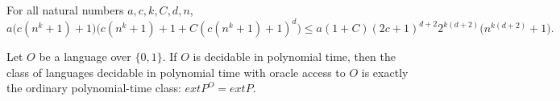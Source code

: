 \begin{theorem}
\label{Complexity.b1_budget}
\leanok
{}
For all natural numbers
$a,c,k,C,d,n$,\[a\bigl(c(n^k+1)+1\bigr)\bigl(c(n^k+1)+1+C(c(n^k+1)+1)^d\bigr)\le
a(1+C)(2c+1)^{d+2}2^{k(d+2)}\bigl(n^{k(d+2)}+1\bigr).\]
\end{theorem}

\begin{theorem}
\label{Complexity.POracle_eq_P_of_mem_P}
\leanok
{}
Let $O$ be a language over $\{0,1\}$. If $O$ is decidable in polynomial time, then the
class of languages decidable in polynomial time with oracle access to $O$ is exactly the
ordinary polynomial-time class: $	ext{P}^O=	ext{P}$.
\end{theorem}
